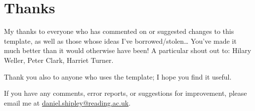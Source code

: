 \section{Thanks}

My thanks to everyone who has commented on or suggested changes to this template, as well as those whose ideas I've borrowed/stolen\dots
You've made it much better than it would otherwise have been!
A particular shout out to: Hilary Weller, Peter Clark, Harriet Turner.

Thank you also to anyone who uses the template; I hope you find it useful.

If you have any comments, error reports, or suggestions for improvement, please email me at \href{mailto:daniel.shipley@reading.ac.uk}{daniel.shipley@reading.ac.uk}.

\cleardoublepage